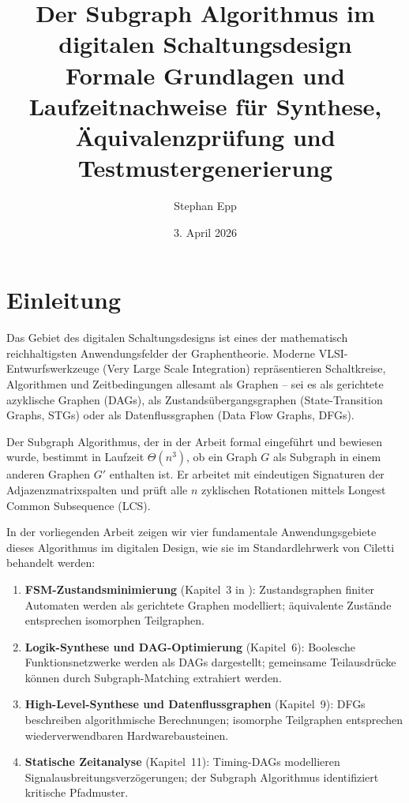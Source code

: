 ﻿\documentclass[a4paper,12pt]{article}
\title{%
  \textbf{Der Subgraph Algorithmus im \\ digitalen Schaltungsdesign}\\[0.5em]
  \large Formale Grundlagen und Laufzeitnachweise für Synthese,\\
  Äquivalenzprüfung und Testmustergenerierung
}
\author{Stephan Epp}
\date{3. April 2026}
\theoremstyle{definition}
\begin{document}
\maketitle
\tableofcontents
\newpage

\section{Einleitung}

Das Gebiet des digitalen Schaltungsdesigns ist eines der mathematisch reichhaltigsten
Anwendungsfelder der Graphentheorie. Moderne VLSI-Entwurfswerkzeuge (Very Large Scale
Integration) repräsentieren Schaltkreise, Algorithmen und Zeitbedingungen allesamt als
Graphen -- sei es als gerichtete azyklische Graphen (DAGs), als Zustandsübergangsgraphen
(State-Transition Graphs, STGs) oder als Datenflussgraphen (Data Flow Graphs, DFGs).

Der Subgraph Algorithmus, der in der Arbeit \cite{subgraph2026} formal eingeführt und
bewiesen wurde, bestimmt in Laufzeit $\Theta(n^3)$, ob ein Graph $G$ als Subgraph in einem
anderen Graphen $G'$ enthalten ist. Er arbeitet mit eindeutigen Signaturen der
Adjazenzmatrixspalten und prüft alle $n$ zyklischen Rotationen mittels Longest Common
Subsequence (LCS).

In der vorliegenden Arbeit zeigen wir vier fundamentale Anwendungsgebiete dieses
Algorithmus im digitalen Design, wie sie im Standardlehrwerk von Ciletti
\cite{ciletti2011} behandelt werden:

\begin{enumerate}
  \item \textbf{FSM-Zustandsminimierung} (Kapitel~3 in \cite{ciletti2011}): Zustandsgraphen
        finiter Automaten werden als gerichtete Graphen modelliert; äquivalente Zustände
        entsprechen isomorphen Teilgraphen.
  \item \textbf{Logik-Synthese und DAG-Optimierung} (Kapitel~6): Boolesche
        Funktionsnetzwerke werden als DAGs dargestellt; gemeinsame Teilausdrücke können
        durch Subgraph-Matching extrahiert werden.
  \item \textbf{High-Level-Synthese und Datenflussgraphen} (Kapitel~9): DFGs beschreiben
        algorithmische Berechnungen; isomorphe Teilgraphen entsprechen wiederverwendbaren
        Hardwarebausteinen.
  \item \textbf{Statische Zeitanalyse} (Kapitel~11): Timing-DAGs modellieren
        Signalausbreitungsverzögerungen; der Subgraph Algorithmus identifiziert kritische
        Pfadmuster.
\end{enumerate}
\end{document}
